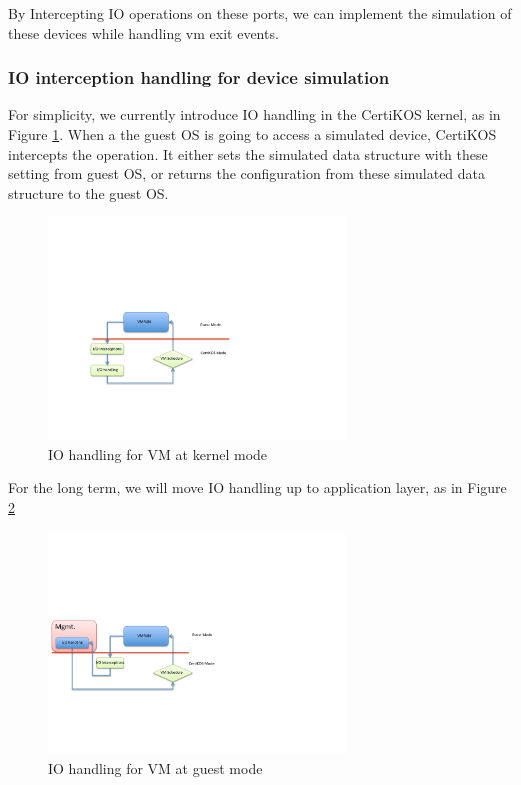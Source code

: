 \documentclass[a4paper,12pt]{article}
\begin{document}
By Intercepting IO operations on these ports, we can implement the simulation of these devices while handling vm exit events.

\subsubsection{IO interception  handling for device simulation}


For simplicity, we currently introduce IO handling in the CertiKOS kernel, as  in Figure \ref{fig:iohandling}.  When a the guest OS is going to access a simulated device, CertiKOS intercepts the operation. It either sets the simulated data structure with these setting from guest OS, or returns the configuration from these simulated data structure to the guest OS.

\begin{figure}[!ht]
 \centerline{
 \includegraphics[width=0.7\textwidth]{IO_handling}}
 \caption{IO handling for VM at kernel mode} \label{fig:iohandling}
\end{figure}

For the long term, we will move IO handling up to application layer,  as in Figure \ref{fig:iohandling2}
\begin{figure}[!ht]
 \centerline{
 \includegraphics[width=0.7\textwidth]{IO_handling2}}
 \caption{IO handling for VM at guest mode} \label{fig:iohandling2}
\end{figure}
\end{document}
